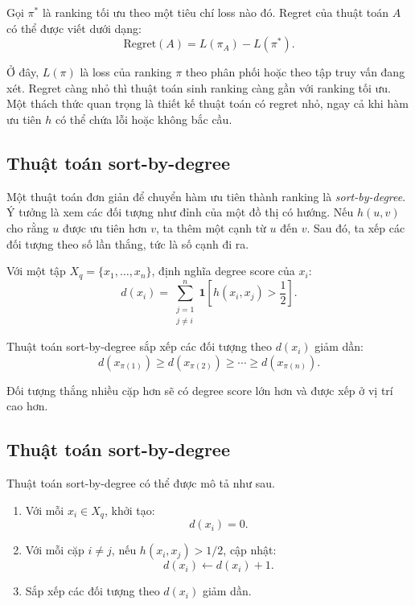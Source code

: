 Gọi \(\pi^{*}\) là ranking tối ưu theo một tiêu chí loss nào đó. Regret của thuật toán \(A\) có thể được viết dưới dạng:
\begin{equation}
    \mathrm{Regret}(A)
    =
    L(\pi_A)-L(\pi^{*}).
    \label{eq:section7-regret-definition}
\end{equation}

Ở đây, \(L(\pi)\) là loss của ranking \(\pi\) theo phân phối hoặc theo tập truy vấn đang xét. Regret càng nhỏ thì thuật toán sinh ranking càng gần với ranking tối ưu. Một thách thức quan trọng là thiết kế thuật toán có regret nhỏ, ngay cả khi hàm ưu tiên \(h\) có thể chứa lỗi hoặc không bắc cầu.

\subsection{Thuật toán sort-by-degree}

Một thuật toán đơn giản để chuyển hàm ưu tiên thành ranking là \textit{sort-by-degree}. Ý tưởng là xem các đối tượng như đỉnh của một đồ thị có hướng. Nếu \(h(u,v)\) cho rằng \(u\) được ưu tiên hơn \(v\), ta thêm một cạnh từ \(u\) đến \(v\). Sau đó, ta xếp các đối tượng theo số lần thắng, tức là số cạnh đi ra.

Với một tập \(X_q=\{x_1,\ldots,x_n\}\), định nghĩa degree score của \(x_i\):
\begin{equation}
    d(x_i)
    =
    \sum_{\substack{j=1\\j\neq i}}^{n}
    \mathbf{1}
    \left[
        h(x_i,x_j)>\frac{1}{2}
    \right].
    \label{eq:section7-degree-score}
\end{equation}

Thuật toán sort-by-degree sắp xếp các đối tượng theo \(d(x_i)\) giảm dần:
\[
    d(x_{\pi(1)})\geq d(x_{\pi(2)})\geq \cdots \geq d(x_{\pi(n)}).
\]

Đối tượng thắng nhiều cặp hơn sẽ có degree score lớn hơn và được xếp ở vị trí cao hơn.

\subsection{Thuật toán sort-by-degree}

Thuật toán sort-by-degree có thể được mô tả như sau.

\begin{enumerate}[label=\textbf{Bước \arabic*.}, leftmargin=*]
    \item Với mỗi \(x_i\in X_q\), khởi tạo:
    \[
        d(x_i)=0.
    \]

    \item Với mỗi cặp \(i\neq j\), nếu \(h(x_i,x_j)>1/2\), cập nhật:
    \[
        d(x_i)\leftarrow d(x_i)+1.
    \]

    \item Sắp xếp các đối tượng theo \(d(x_i)\) giảm dần.
\end{enumerate}


